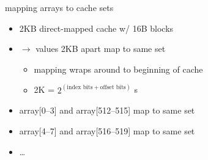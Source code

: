 \begin{frame}{mapping arrays to cache sets}
\begin{itemize}
\item 2KB direct-mapped cache w/ 16B blocks
\item $\rightarrow$ values 2KB apart map to same set
    \begin{itemize}
    \item mapping wraps around to beginning of cache
    \item 2K = $2^(\text{index bits} + \text{offset bits})$ s
    \end{itemize}
\vspace{.5cm}
\item<2-> array[0--3] and array[512--515] map to same set
\item<2-> array[4--7] and array[516--519] map to same set
\item<2-> \ldots
\end{itemize}
\end{frame}
